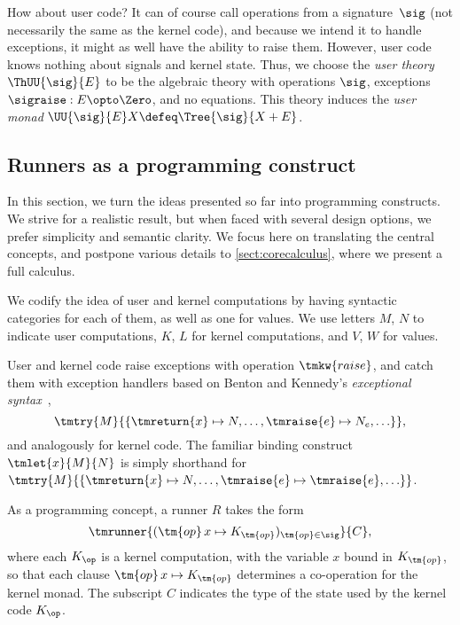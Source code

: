 How about user code? It can of course call operations from a 
signature~$\sig$ (not necessarily the same as the kernel code), and because we
intend it to handle exceptions, it might as well have the ability to raise them.
However, user code knows nothing about signals and kernel state. Thus, we choose the \emph{user theory
  $\ThUU{\sig}{E}$} to be the algebraic theory with operations $\sig$, exceptions
$\sigraise : E \opto \Zero$, and no equations. This theory induces the \emph{user
  monad} $\UU{\sig}{E} X \defeq \Tree{\sig}{X + E}$.

\subsection{Runners as a programming construct}
\label{sec:runn-as-progr}

In this section, we turn the ideas presented so far into programming constructs.
We strive for a realistic result,
but when faced with several design options, we prefer simplicity and semantic
clarity. We focus here on translating the central concepts, and postpone
various details to \cref{sect:corecalculus}, where we present a full calculus.

We codify the idea of user and kernel computations by having syntactic
categories for each of them, as well as one for values. We use letters $M$, 
$N$ to indicate user computations, $K$, $L$ for kernel computations, 
and $V$, $W$ for values.

User and kernel code raise exceptions with operation $\tmkw{raise}$, and catch
them with exception handlers based on Benton and Kennedy's \emph{exceptional
  syntax}~\cite{Benton:ExceptionalSyntax},
%
\begin{equation*}
  \tmtry{M}{\{
    \tmreturn{x} \mapsto N,
    \ldots, \tmraise{e} \mapsto N_e, \ldots
  \}}, 
\end{equation*}
%
and analogously for kernel code. The familiar binding construct
%
$\tmlet{x}{M}{N}$
%
is simply shorthand for
%
$\tmtry{M}{\{\tmreturn{x} \mapsto N, \ldots, \tmraise{e} \mapsto \tmraise{e}, \ldots\}}$.

As a programming concept, a runner $R$ takes the form
%
\begin{equation*}
  \tmrunner{(\tm{op}\,x \mapsto K_{\tm{op}})_{\tm{op} \in \sig}}{C}, 
\end{equation*}
%
where each $K_\op$ is a kernel computation, with the variable $x$ bound in $K_{\tm{op}}$, so that
each clause $\tm{op} \, x \mapsto K_{\tm{op}}$ determines a co-operation for the
kernel monad. The subscript $C$ indicates the type of the state used by  
the kernel code $K_\op$.

